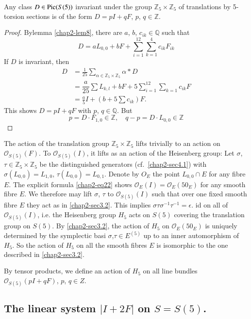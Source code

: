 \begin{lemma}\label{chap2-lem10}
Any class $D\in \operatorname{Pic}(S(5))$ invariant under the group
$\mathbb{Z}_{5}\times \mathbb{Z}_{5}$ of translations by 5-torsion
sections is of the form $D=pI+qF$, $p$, $q\in \mathbb{Z}$. 
\end{lemma}

\begin{proof}
By\pageoriginale  lemma \ref{chap2-lem8}, there are $a$, $b$,
$c_{ik}\in \mathbb{Q}$ such that 
$$
D=aL_{0,0}+bF+\sum^{12}_{i=1}\sum^{4}_{k=1}c_{ik}F_{ik}
$$
If $D$ is invariant, then
\begin{align*}
D
&= \frac{1}{25}\sum_{\alpha\in \mathbb{Z}_{5}\times \mathbb{Z}_{5}}\alpha\ast
D\\
&= \dfrac{a}{25}\sum L_{k,l}+bF+5\sum^{12}_{i=1}\sum_{k=1}c_{ik}F\\
&= \frac{a}{5}I+(b+5\sum c_{ik})F.
\end{align*}
This shows $D=pI+qF$ with $p$, $q\in \mathbb{Q}$. But
$$
p=D\cdot F_{1,0}\in \mathbb{Z},\quad q-p=D\cdot L_{0,0}\in \mathbb{Z}
$$
\end{proof}

The action of the translation group
$\mathbb{Z}_{5}\times \mathbb{Z}_{5}$ lifts trivially to an action on
$\mathscr{O}_{S(5)}(F)$. To $\mathscr{O}_{S(5)}(I)$, it lifts as an
action of the Heisenberg group: Let $\sigma$,
$\tau\in \mathbb{Z}_{5}\times \mathbb{Z}_{5}$ be the distinguished
generators (cf.~\ref{chap2-sec4.1}) with $\sigma(L_{0,0})=L_{1,0}$,
$\tau(L_{0,0})=L_{0,1}$. Denote by $O_{E}$ the point $L_{0,0}\cap E$
for any fibre $E$. The explicit formula \eqref{chap2-eq22} shows
$\mathscr{O}_{E}(I)=\mathscr{O}_{E}(50_{E})$ for any smooth fibre
$E$. We therefore may lift $\sigma$, $\tau$ to $\mathscr{O}_{S(5)}(I)$
such that over one fixed smooth fibre $E$ they act as
in \ref{chap2-sec3.2}. This implies
$\sigma\tau\sigma^{-1}\tau^{-1}=\epsilon$. id on all of
$\mathscr{O}_{S(5)}(I)$, i.e. the Heisenberg group $H_{5}$ acts on
$S(5)$ covering the translation group on
$S(5)$. By \ref{chap2-sec3.2}, the action of $H_{5}$ on
$\mathscr{O}_{E}(50_{E})$ is uniquely determined by the symplectic
basi $\sigma$,\pageoriginale $\tau\in E^{(5)}$ up to an inner
automorphism of $H_{5}$. So the action of $H_{5}$ on all the smooth
fibres $E$ is isomorphic to the one described in \ref{chap2-sec3.2}.

By tensor products, we define an action of $H_{5}$ on all line bundles
$\mathscr{O}_{S(5)}(pI+qF)$, $p$, $q\in Z$.

\subsection{The linear system \texorpdfstring{$|I+2F|$}{I2F} on \texorpdfstring{$S=S(5)$}{SS5}.}\label{chap2-sec4.4}



